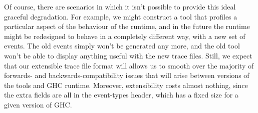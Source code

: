 Of course, there are scenarios in which it isn't possible to provide
this ideal graceful degradation.  For example, we might construct a
tool that profiles a particular aspect of the behaviour of the
runtime, and in the future the runtime might be redesigned to behave
in a completely different way, with a new set of events.  The old
events simply won't be generated any more, and the old tool won't be
able to display anything useful with the new trace files.  Still, we
expect that our extensible trace file format will allows us to smooth
over the majority of forwards- and backwards-compatibility issues that
will arise between versions of the tools and GHC runtime.  Moreover,
extensibility costs almost nothing, since the extra fields are all in
the event-types header, which has a fixed size for a given version of
GHC.
